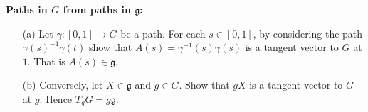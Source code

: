\documentclass[12pt]{article}
\begin{document}
\iffalse
\begin{answer}
{\bf (a) implies (b):} Given such a solution we differentiate to get
\[\frac{\partial^2\phi}{\partial s\partial t}=\frac{\partial\phi}{\partial t}\xi+\phi\frac{\partial\xi}{\partial t}=\frac{\partial\phi}{\partial s}\eta+\phi\frac{\partial\eta}{\partial s}\]
so using ($\star$) we get
\[\phi(\partial_t\xi-\partial_s\eta)=\phi[\xi,\eta]\]
which gives (b).

{\bf (b) implies (a):} We first solve the ODE
\[\frac{d\phi}{ds}(s,0)=\phi(s,0)\xi(s,0)\]
when $t=0$. Now we use $\phi(s,0)$ as an initial condition for the ODE
\[\frac{d\phi}{dt}(s,t)=\phi(s,t)\eta(s,t)\]
for each fixed $s$. This allows us to define $\phi(s,t)$ for all $(s,t)$ and by construction it satisfies $\partial\phi/\partial t=\phi\eta$. It only remains to check that $\partial\phi/\partial s=\phi\xi$. Define $\beta(s,t)=\frac{\partial\phi}{\partial s}(s,t)-\phi(s,t)\xi(s,t)$ and note that by construction $\beta(s,0)=0$. We will show that $\frac{\partial\beta}{\partial t}(s,t)=\beta(s,t)\eta(s,t)$ so that $\beta$ is identically zero (because of the zero initial condition). We have
\begin{align*}
\frac{\partial\beta}{\partial t}&=\frac{\partial^2\phi}{\partial s\partial t}-\frac{\partial\phi}{\partial t}\xi-\phi\frac{\partial\xi}{\partial t}\\
&=\frac{\partial\phi}{\partial s}\eta+\phi\frac{\partial\eta}{\partial s}-\phi\eta\xi-\phi\frac{\partial\xi}{\partial t}
\end{align*}
where we have used the equation $\partial\phi/\partial t=\phi\eta$ twice. Now we use the identity $\frac{\partial\xi}{\partial t}-\frac{\partial\eta}{\partial s}=[\xi,\eta]$ to get
\begin{align*}\frac{\partial\beta}{\partial t}&=\phi[\eta,\xi]+\frac{\partial\phi}{\partial s}\eta-\frac{\partial\phi}{\partial t}\xi\\
&=\beta\eta\end{align*}
since $[\eta,\xi]=\eta\xi-\xi\eta$.
\end{answer}
\fi


{\bf Paths in $G$ from paths in $\mathfrak{g}$:}

\begin{question}
\begin{enumerate}
\item[(a)]  Let $\gamma\colon[0,1]\to G$ be a path. For each $s\in[0,1]$, by considering the path $\gamma(s)^{-1}\gamma(t)$ show that $A(s)=\gamma^{-1}(s)\dot{\gamma}(s)$ is a tangent vector to $G$ at $1$. That is $A(s)\in\mathfrak{g}$.

\item[(b)] Conversely, let $X\in\mathfrak{g}$ and $g\in G$. Show that $gX$ is a tangent vector to $G$ at $g$. Hence $T_gG=g\mathfrak{g}$.
\end{enumerate}
\end{question}
\end{document}
